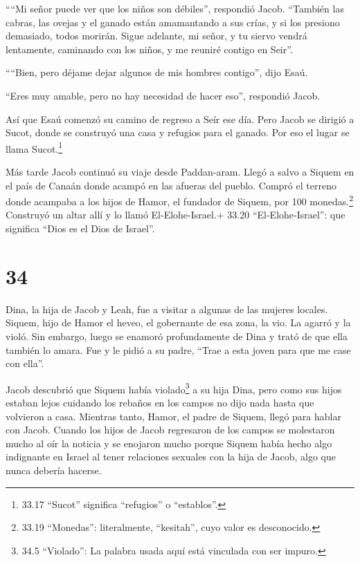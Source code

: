  ````Mi señor puede ver que los niños son débiles'',
respondió Jacob. ``También las cabras, las ovejas y el ganado están
amamantando a sus crías, y si los presiono demasiado, todos morirán.
 Sigue adelante, mi señor, y tu siervo vendrá lentamente,
caminando con los niños, y me reuniré contigo en Seir''.

 ````Bien, pero déjame dejar algunos de mis hombres
contigo'', dijo Esaú.

``Eres muy amable, pero no hay necesidad de hacer eso'', respondió
Jacob.

 Así que Esaú comenzó su camino de regreso a Seír ese día.
 Pero Jacob se dirigió a Sucot, donde se construyó una casa
y refugios para el ganado. Por eso el lugar se llama Sucot.\footnote{33.17
  ``Sucot'' significa ``refugios'' o ``establos''.}

 Más tarde Jacob continuó su viaje desde Paddan-aram. Llegó
a salvo a Siquem en el país de Canaán donde acampó en las afueras del
pueblo.  Compró el terreno donde acampaba a los hijos de
Hamor, el fundador de Siquem, por 100 monedas.\footnote{33.19
  ``Monedas'': literalmente, ``kesitah'', cuyo valor es desconocido.}
 Construyó un altar allí y lo llamó El-Elohe-Israel.+ 33.20
``El-Elohe-Israel'': que significa ``Dios es el Dios de Israel''.

\hypertarget{section-33}{%
\section{34}\label{section-33}}

 Dina, la hija de Jacob y Leah, fue a visitar a algunas de
las mujeres locales.  Siquem, hijo de Hamor el heveo, el
gobernante de esa zona, la vio. La agarró y la violó.  Sin
embargo, luego se enamoró profundamente de Dina y trató de que ella
también lo amara.  Fue y le pidió a su padre, ``Trae a esta
joven para que me case con ella''.

 Jacob descubrió que Siquem había violado\footnote{34.5
  ``Violado'': La palabra usada aquí está vinculada con ser impuro.} a
su hija Dina, pero como sus hijos estaban lejos cuidando los rebaños en
los campos no dijo nada hasta que volvieron a casa. 
Mientras tanto, Hamor, el padre de Siquem, llegó para hablar con Jacob.
 Cuando los hijos de Jacob regresaron de los campos se
molestaron mucho al oír la noticia y se enojaron mucho porque Siquem
había hecho algo indignante en Israel al tener relaciones sexuales con
la hija de Jacob, algo que nunca debería hacerse.

